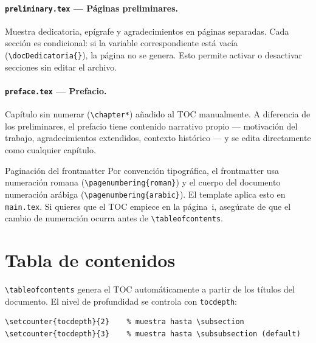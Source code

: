 \paragraph{\texttt{preliminary.tex} --- Páginas preliminares.}
Muestra dedicatoria, epígrafe y agradecimientos en páginas separadas.
Cada sección es condicional: si la variable correspondiente está vacía
(\texttt{\textbackslash docDedicatoria\{\}}), la página no se genera.
Esto permite activar o desactivar secciones sin editar el archivo.

\paragraph{\texttt{preface.tex} --- Prefacio.}
Capítulo sin numerar (\texttt{\textbackslash chapter*}) añadido al TOC
manualmente. A diferencia de los preliminares, el prefacio tiene contenido
narrativo propio --- motivación del trabajo, agradecimientos extendidos,
contexto histórico --- y se edita directamente como cualquier capítulo.

\begin{observacion}{Paginación del frontmatter}
Por convención tipográfica, el frontmatter usa numeración romana
(\texttt{\textbackslash pagenumbering\{roman\}}) y el cuerpo del documento
numeración arábiga (\texttt{\textbackslash pagenumbering\{arabic\}}).
El template aplica esto en \texttt{main.tex}. Si quieres que el TOC empiece
en la página~i, asegúrate de que el cambio de numeración ocurra antes de
\texttt{\textbackslash tableofcontents}.
\end{observacion}

\section{Tabla de contenidos}
\label{sec:toc}

\texttt{\textbackslash tableofcontents} genera el TOC automáticamente a
partir de los títulos del documento. El nivel de profundidad se controla
con \texttt{tocdepth}:

\begin{lstlisting}[style=latex, frame=none, numbers=none]
\setcounter{tocdepth}{2}    % muestra hasta \subsection
\setcounter{tocdepth}{3}    % muestra hasta \subsubsection (default)
\end{lstlisting}

